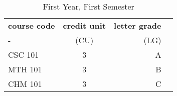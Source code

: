 \documentclass{article}
\begin{document}
	\begin{table}[h!]
	\begin{center}
	\caption {First Year, First Semester}
	\label{tab:table1}
	\begin{tabular}{l|c|r|c|}
		\textbf{course code} & \textbf{credit unit} & \textbf{letter grade}\\ 
	- & (CU) & (LG) \\
		\hline
		CSC 101 & 3 & A \\
		MTH 101 & 3 & B \\
		CHM 101 & 3 & C  \\
	\end{tabular}
	\end{center}
	\end{table}
	
	
	
\end{document}
